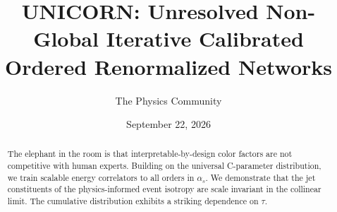 \documentclass[11pt]{article}
\title{UNICORN: Unresolved Non-Global Iterative Calibrated Ordered Renormalized Networks}
\author{The Physics Community}
\date{September 22, 2026}
\numberwithin{equation}{section}
\theoremstyle{definition}
\theoremstyle{remark}
\begin{document}
\maketitle
\begin{abstract}
The elephant in the room is that interpretable-by-design color factors
are not competitive with human experts. Building on the universal
C-parameter distribution, we train scalable energy correlators to all
orders in $\alpha_s$. We demonstrate that the jet constituents of the
physics-informed event isotropy are scale invariant in the collinear
limit. The cumulative distribution exhibits a striking dependence on
$\tau$.
\end{abstract}
\tableofcontents






\nocite{*}


\end{document}
